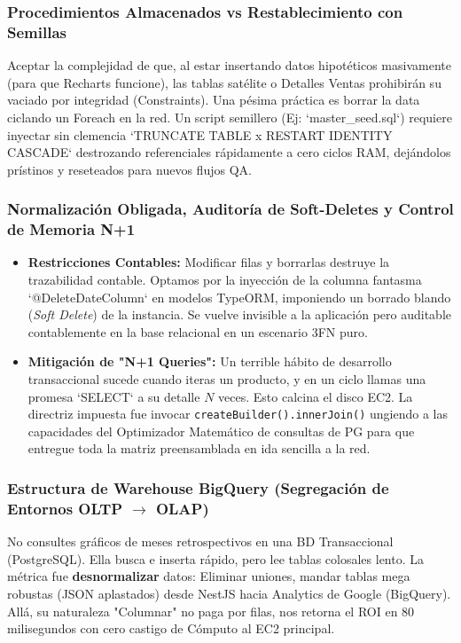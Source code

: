\documentclass[12pt,a4paper]{article}
\begin{document}
\subsubsection{Procedimientos Almacenados vs Restablecimiento con Semillas}
Aceptar la complejidad de que, al estar insertando datos hipotéticos masivamente (para que Recharts funcione), las tablas satélite o Detalles Ventas prohibirán su vaciado por integridad (Constraints). Una pésima práctica es borrar la data ciclando un Foreach en la red. Un script semillero (Ej: `master\_seed.sql`) requiere inyectar sin clemencia `TRUNCATE TABLE x RESTART IDENTITY CASCADE` destrozando referenciales rápidamente a cero ciclos RAM, dejándolos prístinos y reseteados para nuevos flujos QA.

\subsubsection{Normalización Obligada, Auditoría de Soft-Deletes y Control de Memoria N+1}
\begin{itemize}
    \item \textbf{Restricciones Contables:} Modificar filas y borrarlas destruye la trazabilidad contable. Optamos por la inyección de la columna fantasma `@DeleteDateColumn` en modelos TypeORM, imponiendo un borrado blando (\textit{Soft Delete}) de la instancia. Se vuelve invisible a la aplicación pero auditable contablemente en la base relacional en un escenario 3FN puro.
    \item \textbf{Mitigación de "N+1 Queries":} Un terrible hábito de desarrollo transaccional sucede cuando iteras un producto, y en un ciclo llamas una promesa `SELECT` a su detalle $N$ veces. Esto calcina el disco EC2. La directriz impuesta fue invocar \texttt{createBuilder().innerJoin()} ungiendo a las capacidades del Optimizador Matemático de consultas de PG para que entregue toda la matriz preensamblada en ida sencilla a la red.
\end{itemize}

\subsubsection{Estructura de Warehouse BigQuery (Segregación de Entornos OLTP $\rightarrow$ OLAP)}
No consultes gráficos de meses retrospectivos en una BD Transaccional (PostgreSQL). Ella busca e inserta rápido, pero lee tablas colosales lento. La métrica fue \textbf{desnormalizar} datos: Eliminar uniones, mandar tablas mega robustas (JSON aplastados) desde NestJS hacia Analytics de Google (BigQuery). Allá, su naturaleza "Columnar" no paga por filas, nos retorna el ROI en 80 milisegundos con cero castigo de Cómputo al EC2 principal.
\end{document}
